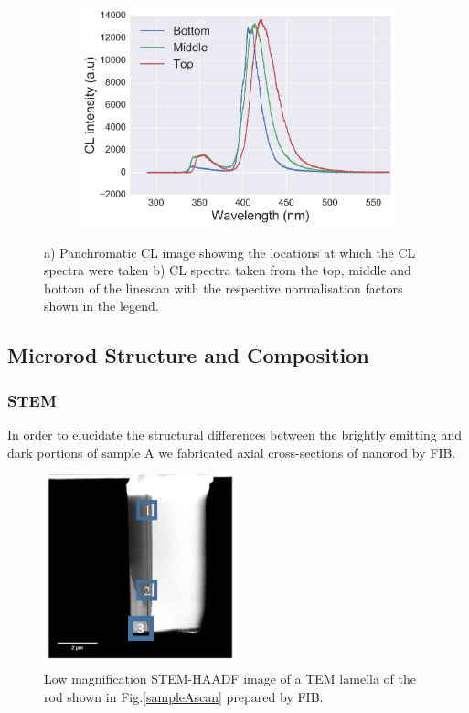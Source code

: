 \begin{figure}[!th]
\begin{subfigure}[!th]{0.3\textwidth}
	\end{subfigure}%
	\hspace*{-1cm}
	\begin{subfigure}[!th]{0.6\textwidth}
		\centering
		\includegraphics[width=1\linewidth]{Figs/Ch6/C6525}
		\caption{}
	\end{subfigure}%
	
	\caption{a) Panchromatic CL image showing the locations at which the CL spectra were taken b) CL spectra taken from the top, middle and bottom of the linescan with the respective normalisation factors shown in the legend.}
	\label{B-spectra}
\end{figure}
\FloatBarrier


\subsection{Microrod Structure and Composition}

\subsubsection{STEM}
\label{HAADF}
In order to elucidate the structural differences between the brightly emitting and dark portions of sample A we fabricated axial cross-sections of nanorod by FIB.

\begin{figure}[!h]
	\centering
	\includegraphics[width=0.5\textwidth]{Figs/Ch6/Aoverview}
	\caption{Low magnification STEM-HAADF image of a TEM lamella of the rod shown in Fig.\ref{sampleAscan} prepared by FIB.}
	\label{AHAADFoverview}
\end{figure}
\FloatBarrier 

